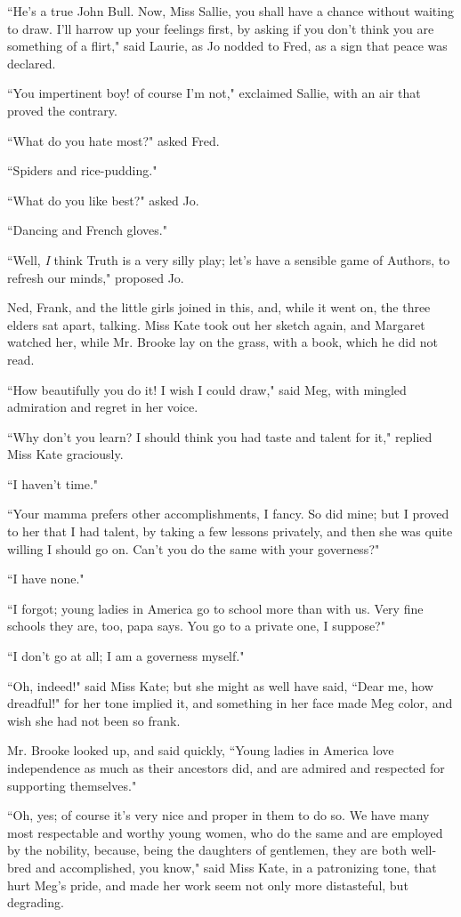 ``He's a true John Bull. Now, Miss Sallie, you shall have
a chance without waiting to draw. I'll harrow up your
feelings first, by asking if you don't think you are
something of a flirt," said Laurie, as Jo nodded to Fred, as a sign that
peace was declared.

``You impertinent boy! of course I'm not," exclaimed
Sallie, with an air that proved the contrary.

``What do you hate most?" asked Fred.

``Spiders and rice-pudding."

``What do you like best?" asked Jo.

``Dancing and French gloves."

``Well, \emph{I} think Truth is a very silly play; let's
have a sensible game of Authors, to refresh our minds," proposed Jo.

Ned, Frank, and the little girls joined in this, and, while it went on,
the three elders sat apart, talking. Miss Kate took out her sketch
again, and Margaret watched her, while Mr. Brooke lay on the grass, with
a book, which he did not read.

``How beautifully you do it! I wish I could draw," said Meg, with mingled
admiration and regret in her voice.

``Why don't you learn? I should think you had taste and
talent for it," replied Miss Kate graciously.

``I haven't time."

``Your mamma prefers other accomplishments, I fancy. So did mine; but I
proved to her that I had talent, by taking a few lessons privately, and
then she was quite willing I should go on. Can't you do
the same with your governess?"

``I have none."

``I forgot; young ladies in America go to school more than with us. Very
fine schools they are, too, papa says. You go to a private one, I
suppose?"

``I don't go at all; I am a governess myself."

``Oh, indeed!" said Miss Kate; but she might as well have said, ``Dear me,
how dreadful!" for her tone implied it, and something in her face made
Meg color, and wish she had not been so frank.

Mr. Brooke looked up, and said quickly, ``Young ladies in America love
independence as much as their ancestors did, and are admired and
respected for supporting themselves."

``Oh, yes; of course it's very nice and proper in them to
do so. We have many most respectable and worthy young women, who do the
same and are employed by the nobility, because, being the daughters of
gentlemen, they are both well-bred and accomplished, you know," said
Miss Kate, in a patronizing tone, that hurt Meg's pride,
and made her work seem not only more distasteful, but degrading.

